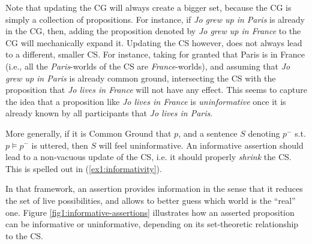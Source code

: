 Note that updating the CG will always create a bigger set, because the CG is simply a collection of propositions. For instance, if \textit{Jo grew up in Paris} is already in the CG, then, adding the proposition denoted by \textit{Jo grew up in France} to the CG will mechanically expand it. Updating the CS however, does not always lead to a different, smaller CS. For instance, taking for granted that Paris is in France (i.e., all the \textit{Paris}-worlds of the CS are \textit{France}-worlds), and assuming that \textit{Jo grew up in Paris} is already common ground, intersecting the CS with the proposition that \textit{Jo lives in France} will not have any effect. This seems to capture the idea that a proposition like \textit{Jo lives in France} is \textit{uninformative} once it is already known by all participants that \textit{Jo lives in Paris}.

More generally, if it is Common Ground that $p$, and a sentence $S$ denoting $p^-$ s.t. $p \vDash p^-$ is uttered, then $S$ will feel uninformative. An informative assertion should lead to a non-vacuous update of the CS, i.e. it should properly \textit{shrink} the CS. This is spelled out in (\ref{ex1:informativity}).

\begin{exe}
	\label{ex1:informativity}
\end{exe}


In that framework, an assertion provides information in the sense that it reduces the set of live possibilities, and allows to better guess which world is the ``real'' one. Figure \ref{fig1:informative-assertions} illustrates how an asserted proposition can be informative or uninformative, depending on its set-theoretic relationship to the CS.

